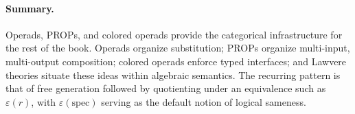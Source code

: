 \documentclass[11pt]{article}
\begin{document}
\paragraph{Summary.}
Operads, PROPs, and colored operads provide the categorical infrastructure for the rest of the book. Operads organize substitution; PROPs organize multi-input, multi-output composition; colored operads enforce typed interfaces; and Lawvere theories situate these ideas within algebraic semantics. The recurring pattern is that of free generation followed by quotienting under an equivalence such as \(\varepsilon(r)\), with \(\varepsilon(\mathrm{spec})\) serving as the default notion of logical sameness.
\end{document}
